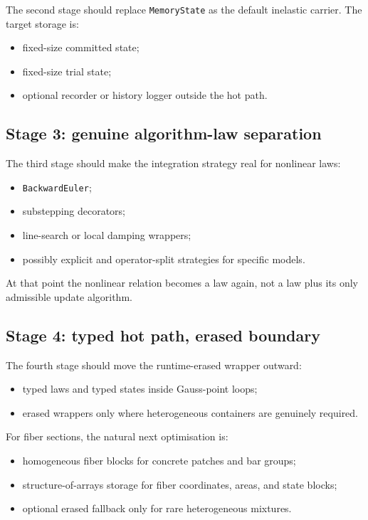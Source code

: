 The second stage should replace \texttt{MemoryState} as the default inelastic
carrier.  The target storage is:
\begin{itemize}
  \item fixed-size committed state;
  \item fixed-size trial state;
  \item optional recorder or history logger outside the hot path.
\end{itemize}

\subsection{Stage 3: genuine algorithm-law separation}

The third stage should make the integration strategy real for nonlinear laws:
\begin{itemize}
  \item \texttt{BackwardEuler};
  \item substepping decorators;
  \item line-search or local damping wrappers;
  \item possibly explicit and operator-split strategies for specific models.
\end{itemize}

At that point the nonlinear relation becomes a law again, not a law plus its
only admissible update algorithm.

\subsection{Stage 4: typed hot path, erased boundary}

The fourth stage should move the runtime-erased wrapper outward:
\begin{itemize}
  \item typed laws and typed states inside Gauss-point loops;
  \item erased wrappers only where heterogeneous containers are genuinely
        required.
\end{itemize}

For fiber sections, the natural next optimisation is:
\begin{itemize}
  \item homogeneous fiber blocks for concrete patches and bar groups;
  \item structure-of-arrays storage for fiber coordinates, areas, and state
        blocks;
  \item optional erased fallback only for rare heterogeneous mixtures.
\end{itemize}

